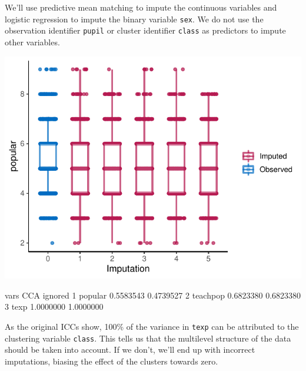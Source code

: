 \documentclass[
]{jss}
\begin{document}
We'll use predictive mean matching to impute the continuous variables
and logistic regression to impute the binary variable \texttt{sex}. We
do not use the observation identifier \texttt{pupil} or cluster
identifier \texttt{class} as predictors to impute other variables.

\begin{CodeChunk}
\end{CodeChunk}

\begin{CodeChunk}


\begin{center}\includegraphics{Manuscript_files/figure-latex/pop_ignored_eval-1} \end{center}

\begin{CodeOutput}
      vars       CCA   ignored
1  popular 0.5583543 0.4739527
2 teachpop 0.6823380 0.6823380
3     texp 1.0000000 1.0000000
\end{CodeOutput}
\end{CodeChunk}

As the original ICCs show, 100\% of the variance in \texttt{texp} can be
attributed to the clustering variable \texttt{class}. This tells us that
the multilevel structure of the data should be taken into account. If we
don't, we'll end up with incorrect imputations, biasing the effect of
the clusters towards zero.
\end{document}
